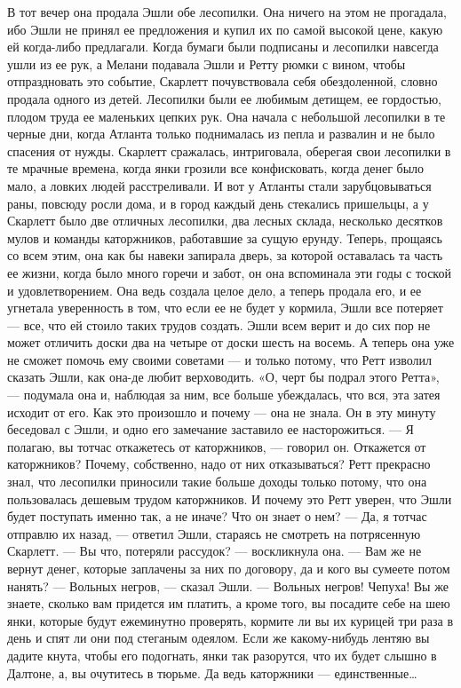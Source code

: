 В тот вечер она продала Эшли обе лесопилки. Она ничего на этом не прогадала, ибо Эшли не принял ее предложения и купил их по самой высокой цене, какую ей когда-либо предлагали. Когда бумаги были подписаны и лесопилки навсегда ушли из ее рук, а Мелани подавала Эшли и Ретту рюмки с вином, чтобы отпраздновать это событие, Скарлетт почувствовала себя обездоленной, словно продала одного из детей.
Лесопилки были ее любимым детищем, ее гордостью, плодом труда ее маленьких цепких рук. Она начала с небольшой лесопилки в те черные дни, когда Атланта только поднималась из пепла и развалин и не было спасения от нужды. Скарлетт сражалась, интриговала, оберегая свои лесопилки в те мрачные времена, когда янки грозили все конфисковать, когда денег было мало, а ловких людей расстреливали. И вот у Атланты стали зарубцовываться раны, повсюду росли дома, и в город каждый день стекались пришельцы, а у Скарлетт было две отличных лесопилки, два лесных склада, несколько десятков мулов и команды каторжников, работавшие за сущую ерунду. Теперь, прощаясь со всем этим, она как бы навеки запирала дверь, за которой оставалась та часть ее жизни, когда было много горечи и забот, он она вспоминала эти годы с тоской и удовлетворением.
Она ведь создала целое дело, а теперь продала его, и ее угнетала уверенность в том, что если ее не будет у кормила, Эшли все потеряет — все, что ей стоило таких трудов создать. Эшли всем верит и до сих пор не может отличить доски два на четыре от доски шесть на восемь. А теперь она уже не сможет помочь ему своими советами — и только потому, что Ретт изволил сказать Эшли, как она-де любит верховодить.
«О, черт бы подрал этого Ретта», — подумала она и, наблюдая за ним, все больше убеждалась, что вся, эта затея исходит от его. Как это произошло и почему — она не знала. Он в эту минуту беседовал с Эшли, и одно его замечание заставило ее насторожиться.
— Я полагаю, вы тотчас откажетесь от каторжников, — говорил он.
Откажется от каторжников? Почему, собственно, надо от них отказываться? Ретт прекрасно знал, что лесопилки приносили такие больше доходы только потому, что она пользовалась дешевым трудом каторжников. И почему это Ретт уверен, что Эшли будет поступать именно так, а не иначе? Что он знает о нем?
— Да, я тотчас отправлю их назад, — ответил Эшли, стараясь не смотреть на потрясенную Скарлетт.
— Вы что, потеряли рассудок? — воскликнула она. — Вам же не вернут денег, которые заплачены за них по договору, да и кого вы сумеете потом нанять?
— Вольных негров, — сказал Эшли.
— Вольных негров! Чепуха! Вы же знаете, сколько вам придется им платить, а кроме того, вы посадите себе на шею янки, которые будут ежеминутно проверять, кормите ли вы их курицей три раза в день и спят ли они под стеганым одеялом. Если же какому-нибудь лентяю вы дадите кнута, чтобы его подогнать, янки так разорутся, что их будет слышно в Далтоне, а, вы очутитесь в тюрьме. Да ведь каторжники — единственные…
